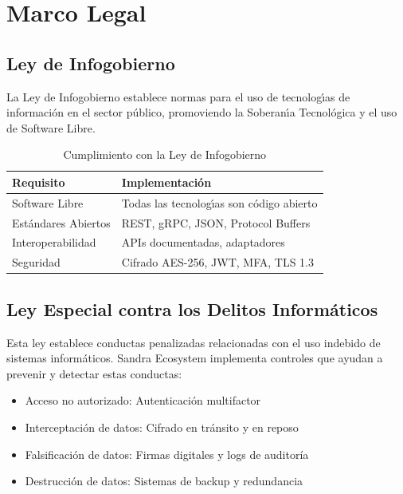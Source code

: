 \chapter{Marco Legal}

\section{Ley de Infogobierno}

La Ley de Infogobierno establece normas para el uso de tecnolog\'{\i}as de informaci\'on en el sector p\'ublico, promoviendo la Soberan\'{\i}a Tecnol\'ogica y el uso de Software Libre.

\begin{table}[H]
\centering
\caption{Cumplimiento con la Ley de Infogobierno}
\begin{tabular}{|l|l|}
\hline
\textbf{Requisito} & \textbf{Implementaci\'on} \\ \hline
Software Libre & Todas las tecnolog\'{\i}as son c\'odigo abierto \\ \hline
Est\'andares Abiertos & REST, gRPC, JSON, Protocol Buffers \\ \hline
Interoperabilidad & APIs documentadas, adaptadores \\ \hline
Seguridad & Cifrado AES-256, JWT, MFA, TLS 1.3 \\ \hline
\end{tabular}
\end{table}

\section{Ley Especial contra los Delitos Inform\'aticos}

Esta ley establece conductas penalizadas relacionadas con el uso indebido de sistemas inform\'aticos. Sandra Ecosystem implementa controles que ayudan a prevenir y detectar estas conductas:

\begin{itemize}
\item Acceso no autorizado: Autenticaci\'on multifactor
\item Interceptaci\'on de datos: Cifrado en tránsito y en reposo
\item Falsificaci\'on de datos: Firmas digitales y logs de auditoría
\item Destrucci\'on de datos: Sistemas de backup y redundancia
\end{itemize}

